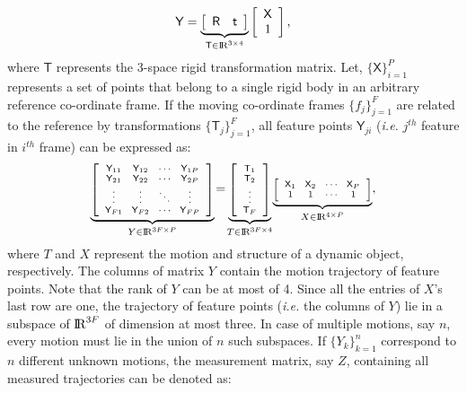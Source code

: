 \documentclass[10pt,twocolumn,letterpaper]{article}  %
\begin{document}
\begin{equation}
\label{eq:rigidBodyMotion}
 \mathsf{Y}  = 
\underset{\mathsf{T} \in {\rm I\!R}^{3 \times 4}}
{\underbrace{\left[
\begin{array}{cc} \mathsf{R} &  \mathsf{t}
\end{array}  \right]}}
\left[ \begin{array}{c} \mathsf{X} \\ 1 \end{array} \right],
\end{equation}
where $\mathsf{T}$ represents the 3-space rigid transformation matrix. Let,  $\{\mathsf{X}\}_{i=1}^{P}$ represents a set of points that belong to a single rigid body in an arbitrary reference co-ordinate frame. If the moving co-ordinate frames $\{f_j\}_{j=1}^{F}$ are related to the reference by transformations $\{\mathsf{T}_j\}_{j=1}^{F}$, all  feature points $\mathsf{Y}_{ji}$ (\textit{i.e.} $j^{th}$ feature in $i^{th}$ frame) can be expressed as:
\begin{equation}
\scriptsize
\underset{Y \in {\rm I\!R}^{3F \times P} } {\underbrace{ \left[
\begin{array}{cccc} \mathsf{Y}_{11} \!&\! \mathsf{Y}_{12} \!&\! \cdots \!&\! \mathsf{Y}_{1P} \\
\mathsf{Y}_{21} \!&\! \mathsf{Y}_{22} \!&\! \cdots \!&\! \mathsf{Y}_{2P} \\
\vdots \!&\! \vdots \!&\!  \ddots \!&\! \vdots \\
\mathsf{Y}_{F1} \!&\! \mathsf{Y}_{F2} \!&\! \cdots \!&\! \mathsf{Y}_{FP}  \end{array} \right] } } \!=\! 
\underset{  T \in {\rm I\!R}^{3F \times 4}  } { \underbrace{ \left[ \begin{array}{c} \mathsf{T}_1 \\ \mathsf{T}_2 \\ \vdots \\ \mathsf{T}_F \end{array} \right] }}
\underset{X \in {\rm I\!R}^{4 \times P}} { \underbrace{ \left[ \begin{array}{cccc} \mathsf{X}_1 \!&\! \mathsf{X}_2 \!&\! \cdots \!&\! \mathsf{X}_P \\ 1 \!&\! 1 \!&\! \cdots \!&\! 1 \end{array} \right] }} ,
\label{eq: rigidMot}
\end{equation}
where $T$  and $X$ represent the motion and structure of a dynamic object, respectively. The columns of matrix $Y$ contain the motion trajectory of feature points. Note that the rank of $Y$ can be at most of 4. Since all the entries of $X$'s last row are one, the trajectory of feature points (\textit{i.e.} the columns of $Y$) lie in a subspace of ${\rm I\!R}^{3F}$ of dimension at most three. In case of multiple motions, say $n$, every motion must lie in the union of $n$ such subspaces. If $\{Y_k\}_{k=1}^{n}$ correspond to $n$ different unknown motions, the measurement matrix, say $Z$, containing all measured trajectories can be denoted as:
\end{document}
